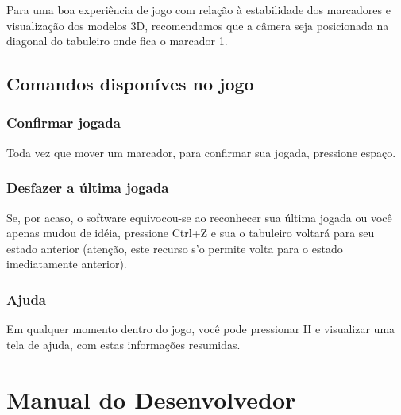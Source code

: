 \documentclass[a4paper,12pt]{book}
\begin{document}
    Para uma boa experi\^encia de jogo com rela\c c\~ao \`a estabilidade dos marcadores e visualiza\c c\~ao dos modelos 3D, recomendamos que a c\^amera seja posicionada na diagonal do tabuleiro onde fica o marcador 1.

  \chapter{Comandos dispon\'ives no jogo}
  \label{ch:comandosdisponiveisnojogo}
    \section{Confirmar jogada}
    \label{sec:confirmarjogada}
    Toda vez que mover um marcador, para confirmar sua jogada, pressione espa\c co.

    \section{Desfazer a \'ultima jogada}
    \label{sec:desfazeraultimajogada}
    Se, por acaso, o software equivocou-se ao reconhecer sua \'ultima jogada ou voc\^e apenas mudou de id\'eia, pressione Ctrl+Z e sua o tabuleiro voltar\'a para seu estado anterior (aten\c c\~ao, este recurso s'o permite volta para o estado imediatamente anterior).

    \section{Ajuda}
    \label{sec:ajuda}
      Em qualquer momento dentro do jogo, voc\^e pode pressionar H e visualizar uma tela de ajuda, com estas informa\c c\~oes resumidas.
     
\part{Manual do Desenvolvedor}
\label{part:manualdodesenvolvedor}
\end{document}
